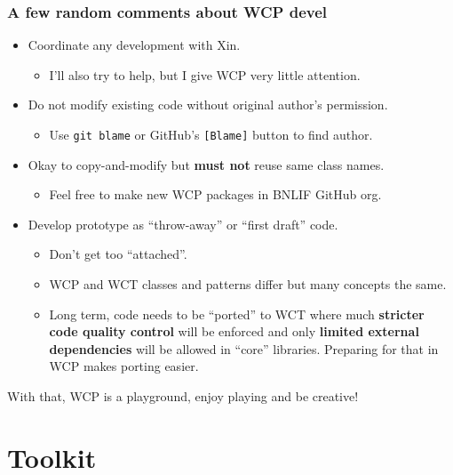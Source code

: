 \documentclass[xcolor=dvipsnames]{beamer}
\begin{document}
\begin{frame}
  \frametitle{A few random comments about WCP devel}

  \footnotesize

  \begin{itemize}
  \item Coordinate any development with Xin.
    \begin{itemize}\scriptsize
    \item I'll also try to help, but I give WCP very little attention.
    \end{itemize}
  \item Do not modify existing code without original author's permission.
    \begin{itemize}\scriptsize
    \item Use \texttt{git blame} or GitHub's \texttt{[Blame]} button to find author.
    \end{itemize}
  \item Okay to copy-and-modify but \textbf{must not} reuse same class
    names.
    \begin{itemize}\scriptsize
    \item Feel free to make new WCP packages in BNLIF GitHub org.
    \end{itemize}
  \item Develop prototype as ``throw-away'' or ``first draft'' code.
    \begin{itemize}\scriptsize
    \item Don't get too ``attached''.

    \item WCP and WCT classes and patterns differ but many concepts the same.

    \item Long term, code needs to be ``ported'' to WCT where much
      \textbf{stricter code quality control} will be enforced and only
      \textbf{limited external dependencies} will be allowed in ``core''
      libraries.  Preparing for that in WCP makes porting easier.
    \end{itemize}
  \end{itemize}
  
  With that, WCP is a playground, enjoy playing and be creative!

\end{frame}


\section{Toolkit}
\end{document}

